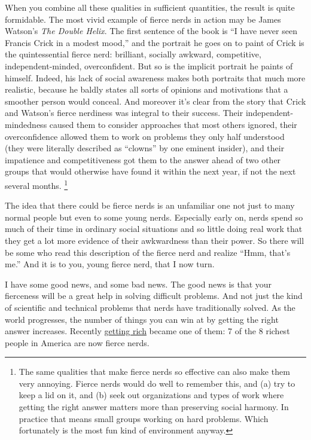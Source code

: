 \documentclass[12pt]{book}
\begin{document}
When you combine all these qualities in sufficient quantities, the
result is quite formidable. The most vivid example of fierce nerds in
action may be James Watson's \emph{The Double Helix}. The first sentence
of the book is ``I have never seen Francis Crick in a modest mood,'' and
the portrait he goes on to paint of Crick is the quintessential fierce
nerd: brilliant, socially awkward, competitive, independent-minded,
overconfident. But so is the implicit portrait he paints of himself.
Indeed, his lack of social awareness makes both portraits that much more
realistic, because he baldly states all sorts of opinions and
motivations that a smoother person would conceal. And moreover it's
clear from the story that Crick and Watson's fierce nerdiness was
integral to their success. Their independent-mindedness caused them to
consider approaches that most others ignored, their overconfidence
allowed them to work on problems they only half understood (they were
literally described as ``clowns'' by one eminent insider), and their
impatience and competitiveness got them to the answer ahead of two other
groups that would otherwise have found it within the next year, if not
the next several months. \footnote{The same qualities that make fierce nerds so effective can also
make them very annoying. Fierce nerds would do well to remember this,
and (a) try to keep a lid on it, and (b) seek out organizations and
types of work where getting the right answer matters more than
preserving social harmony. In practice that means small groups working
on hard problems. Which fortunately is the most fun kind of environment
anyway.}

The idea that there could be fierce nerds is an unfamiliar one not just
to many normal people but even to some young nerds. Especially early on,
nerds spend so much of their time in ordinary social situations and so
little doing real work that they get a lot more evidence of their
awkwardness than their power. So there will be some who read this
description of the fierce nerd and realize ``Hmm, that's me.'' And it is
to you, young fierce nerd, that I now turn.

I have some good news, and some bad news. The good news is that your
fierceness will be a great help in solving difficult problems. And not
just the kind of scientific and technical problems that nerds have
traditionally solved. As the world progresses, the number of things you
can win at by getting the right answer increases. Recently
\href{richnow.html}{getting rich} became one of them: 7 of the 8 richest
people in America are now fierce nerds.
\end{document}
